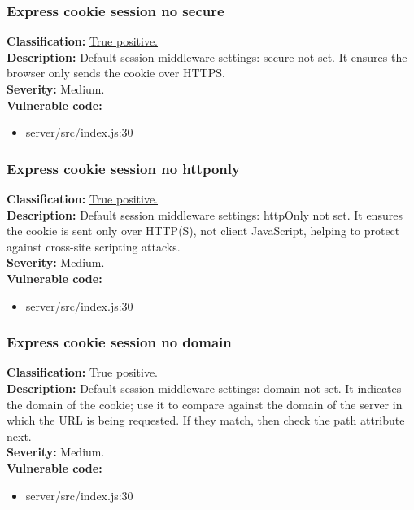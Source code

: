 \documentclass[]{article}
\begin{document}
\subsubsection{Express cookie session no secure}
\textbf{Classification:} \hyperref[subsubsec:sensitive_cookie_without_secure_and_httponly_attributes]{True positive.} \\ 
\textbf{Description:} Default session middleware settings: secure not set. It ensures the browser only
 sends the cookie over HTTPS. \\ 
\textbf{Severity:} Medium. \\ 
\textbf{Vulnerable code:} 
\begin{itemize}
    \item server/src/index.js:30
\end{itemize}

\subsubsection{Express cookie session no httponly}
\textbf{Classification:} \hyperref[subsubsec:cross_site_scripting]{True positive.} \\ 
\textbf{Description:} Default session middleware settings: httpOnly not set. It ensures the cookie is sent 
only over HTTP(S), not client JavaScript, helping to protect against cross-site scripting attacks. \\ 
\textbf{Severity:} Medium. \\ 
\textbf{Vulnerable code:} 
\begin{itemize}
    \item server/src/index.js:30
\end{itemize}

\subsubsection{Express cookie session no domain}
\textbf{Classification:} True positive. \\ 
\textbf{Description:} Default session middleware settings: domain not set. It indicates the domain of 
the cookie; use it to compare against the domain of the server in which the URL is being requested. 
If they match, then check the path attribute next. \\ 
\textbf{Severity:} Medium. \\ 
\textbf{Vulnerable code:} 
\begin{itemize}
    \item server/src/index.js:30
\end{itemize}
\end{document}
